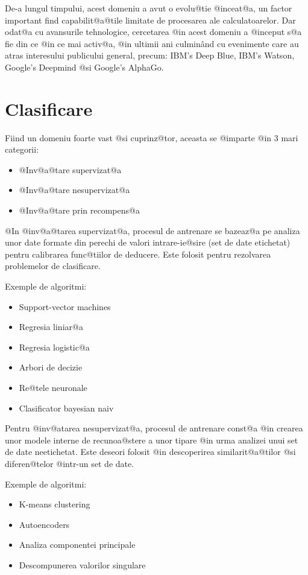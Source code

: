  De-a lungul timpului, acest domeniu a avut o evolu@tie @inceat@a, un factor important find capabilit@a@tile limitate de procesarea ale calculatoarelor. Dar odat@a cu avansurile tehnologice, cercetarea @in acest domeniu a @inceput s@a fie din ce @in ce mai activ@a, @in ultimii ani culmin\^ and cu evenimente care au atras interesului publicului general, precum: IBM's Deep Blue, IBM's Watson, Google's Deepmind @si Google's AlphaGo.
 
 
\newpage

\section{Clasificare}

Fiind un domeniu foarte vast @si cuprinz@tor, aceasta se @imparte @in 3 mari categorii:
\hspace{0.2cm}\begin{itemize}
	\item @Inv@a@tare supervizat@a
	\item @Inv@a@tare nesupervizat@a
	\item @Inv@a@tare prin recompens@a
\end{itemize}

\vspace{0.3cm}
@In @inv@a@tarea supervizat@a, procesul de antrenare se bazeaz@a pe analiza unor date formate din perechi de valori intrare-ie@sire (set de date etichetat) pentru calibrarea func@tiilor de deducere. Este folosit pentru rezolvarea problemelor de clasificare.

Exemple de algoritmi:
\begin{itemize}
	\item Support-vector machines
	\item Regresia liniar@a
	\item Regresia logistic@a
	\item Arbori de decizie
	\item Re@tele neuronale
	\item Clasificator bayesian naiv
\end{itemize}

Pentru @inv@atarea nesupervizat@a, procesul de antrenare const@a @in crearea unor modele interne de recunoa@stere a unor tipare @in urma analizei unui set de date neetichetat. Este deseori folosit @in descoperirea similarit@a@tilor @si diferen@telor @intr-un set de date.

Exemple de algoritmi:
\begin{itemize}
	\item K-means clustering
	\item Autoencoders
	\item Analiza componentei principale
	\item Descompunerea valorilor singulare
\end{itemize}

